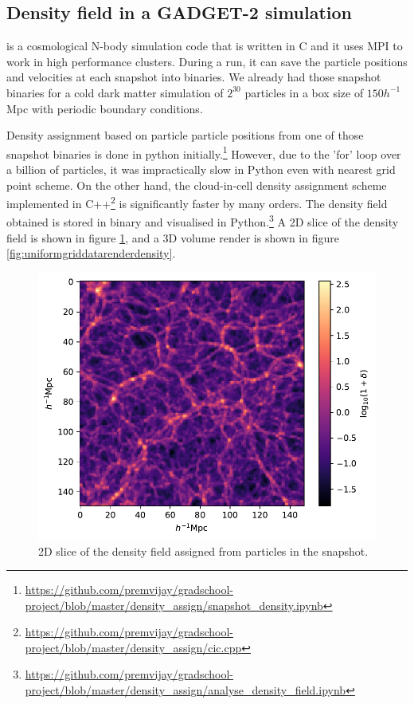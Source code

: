 \documentclass[12pt]{article}
\begin{document}
\subsection*{Density field in a GADGET-2 simulation}
\cite{gadget} is a cosmological N-body simulation code that is written in C and it uses MPI to work in high performance clusters. During a run, it can save the particle positions and velocities at each snapshot into binaries. We already had those snapshot binaries for a cold dark matter simulation of $2^{30}$ particles in a box size of  $150 h^{-1}$ Mpc with periodic boundary conditions. \cite{aseem_shadab}

 
Density assignment based on particle particle positions from one of those snapshot binaries is done in python initially.\footnote{\url{https://github.com/premvijay/gradschool-project/blob/master/density_assign/snapshot_density.ipynb}} However, due to the 'for' loop over a billion of particles, it was impractically slow in Python even with nearest grid point scheme. On the other hand, the cloud-in-cell density assignment scheme implemented in C++\footnote{\url{https://github.com/premvijay/gradschool-project/blob/master/density_assign/cic.cpp}} is significantly faster by many orders. The density field obtained is stored in binary and visualised in Python.\footnote{\url{https://github.com/premvijay/gradschool-project/blob/master/density_assign/analyse_density_field.ipynb}} A 2D slice of the density field is shown in figure \ref{fig:density-field-2d}, and a 3D volume render is shown in figure \ref{fig:uniformgriddatarenderdensity}.



\begin{figure}[H]
	\centering
	\includegraphics[width=0.7\linewidth]{../density_assign/density-field-2D}
	\caption{2D slice of the density field assigned from particles in the snapshot.}
	\label{fig:density-field-2d}
\end{figure}
\end{document}
